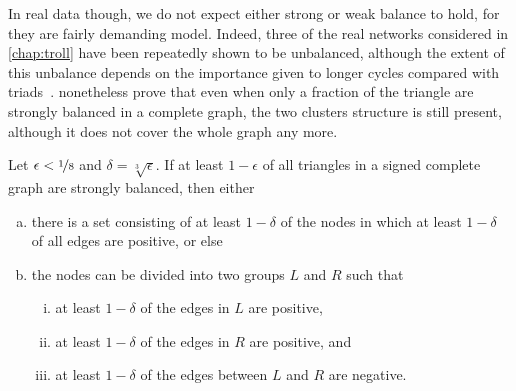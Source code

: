 In real data though, we do not expect either strong or weak balance to hold, for they are fairly
demanding model. Indeed, three of the real networks considered in \autoref{chap:troll} have been
repeatedly shown to be unbalanced, although the extent of this unbalance depends on the importance
given to longer cycles compared with triads~\autocites{Facchetti2011isingmodel}{measureUnbalance14}%
{measureUnbalance17}.
\Textcite[Section 5.5]{BookKleinberg2010}
nonetheless prove that even when only a fraction of the triangle are strongly balanced in a complete
graph, the two clusters structure is still present, although it does not cover the whole graph
any more.

\begin{theorem}
  Let $\epsilon < \nicefrac{1}{8}$ and $\delta = \sqrt[3]\epsilon$. If at least $1-\epsilon$ of all
  triangles in a signed complete graph are strongly balanced, then either
  \begin{enumerate}[(a),nosep]
    \item there is a set consisting of at least $1-\delta$ of the nodes in which at least $1-\delta$
      of all edges are positive, or else
    \item the nodes can be divided into two groups $L$ and $R$ such that
      \begin{enumerate}[(i),nosep]
	\item at least $1-\delta$ of the edges in $L$ are positive,
	\item at least $1-\delta$ of the edges in $R$ are positive, and
	\item at least $1-\delta$ of the edges between $L$ and $R$ are negative.
      \end{enumerate}
  \end{enumerate}
\end{theorem}

